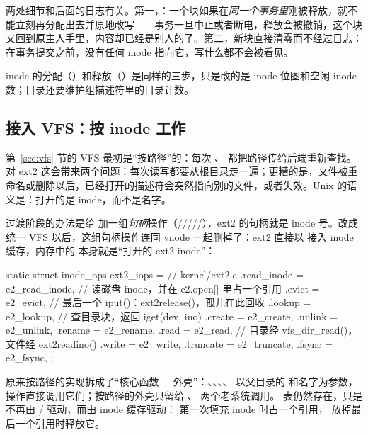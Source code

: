 两处细节和后面的日志有关。第一，：一个块如果在\emph{同一个事务里}刚被释放，就不能立刻再分配出去并原地改写——事务一旦中止或者断电，释放会被撤销，这个块又回到原主人手里，内容却已经是别人的了。第二，新块直接清零而不经过日志：在事务提交之前，没有任何 inode 指向它，写什么都不会被看见。

inode 的分配（）和释放（）是同样的三步，只是改的是 inode 位图和空闲 inode 数；目录还要维护组描述符里的目录计数。

\subsection{接入 VFS：按 inode 工作}

第~\ref{sec:vfs} 节的 VFS 最初是“按路径”的：每次 、 都把路径传给后端重新查找。对 ext2 这会带来两个问题：每次读写都要从根目录走一遍；更糟的是，文件被重命名或删除以后，已经打开的描述符会突然指向别的文件，或者失效。Unix 的语义是：打开的是 inode，而不是名字。

过渡阶段的办法是给  加一组\emph{句柄}操作（/////），ext2 的句柄就是 inode 号。改成统一 VFS 以后，这组句柄操作连同 vnode 一起删掉了：ext2 直接以  接入 inode 缓存，内存中的  本身就是“打开的 ext2 inode”：

\begin{ccode}
static struct inode_ops ext2_iops = {        // kernel/ext2.c
  .read_inode = e2_read_inode,   // 读磁盘 inode，并在 e2.open[] 里占一个引用
  .evict      = e2_evict,        // 最后一个 iput()：ext2release()，孤儿在此回收
  .lookup     = e2_lookup,       // 查目录块，返回 iget(dev, ino)
  .create     = e2_create,  .unlink = e2_unlink,  .rename = e2_rename,
  .read       = e2_read,         // 目录经 vfs_dir_read()，文件经 ext2readino()
  .write      = e2_write,   .truncate = e2_truncate,  .fsync = e2_fsync,
};
\end{ccode}

原来按路径的实现拆成了“核心函数 + 外壳”：、、、、 以父目录的  和名字为参数， 操作直接调用它们；按路径的外壳只留给 、 两个老系统调用。 表仍然存在，只是不再由 / 驱动，而由 inode 缓存驱动： 第一次填充 inode 时占一个引用， 放掉最后一个引用时释放它。

